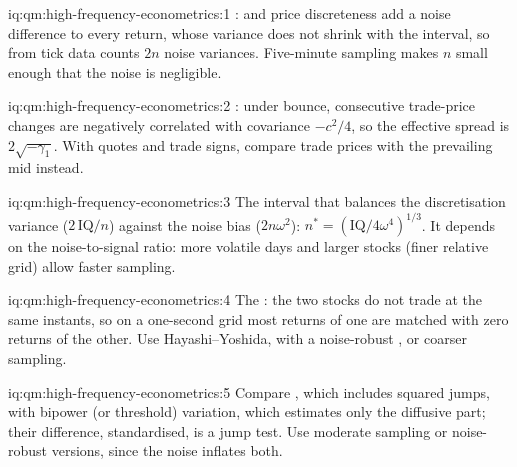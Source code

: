 \begin{solution}{iq:qm:high-frequency-econometrics:1}
:  and price discreteness add a noise difference to every return, whose variance does not shrink with the interval, so 
from tick data counts $2n$ noise variances. Five-minute sampling makes $n$ small enough that the noise is negligible.
\end{solution}

\begin{solution}{iq:qm:high-frequency-econometrics:2}
: under bounce, consecutive trade-price changes are negatively correlated with covariance $-c^2/4$, so the effective spread is $2\sqrt{-\gamma_1}$. With quotes and trade
signs, compare trade prices with the prevailing mid instead.
\end{solution}

\begin{solution}{iq:qm:high-frequency-econometrics:3}
The interval that balances the discretisation variance ($2\,\mathrm{IQ}/n$) against the noise bias ($2n\omega^2$): $n^* = (\mathrm{IQ}/4\omega^4)^{1/3}$. It depends on the noise-to-signal
ratio: more volatile days and larger stocks (finer relative grid) allow faster sampling.
\end{solution}

\begin{solution}{iq:qm:high-frequency-econometrics:4}
The : the two stocks do not trade at the same instants, so on a one-second grid most returns of one are matched with zero returns of the other. Use Hayashi--Yoshida,
 with a noise-robust , or coarser sampling.
\end{solution}

\begin{solution}{iq:qm:high-frequency-econometrics:5}
Compare , which includes squared jumps, with bipower (or threshold) variation, which estimates only the diffusive part; their difference, standardised,
is a jump test. Use moderate sampling or noise-robust versions, since the noise inflates both.
\end{solution}

